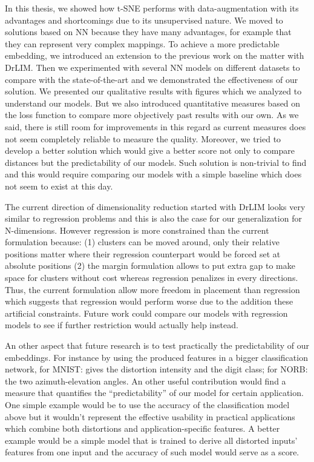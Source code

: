 \documentclass[a4paper,12pt]{report}
\begin{document}
In this thesis, we showed how t-SNE performs with data-augmentation with its advantages and shortcomings due to its unsupervised nature.
We moved to solutions based on NN because they have many advantages, for example that they can represent very complex mappings.
To achieve a more predictable embedding, we introduced an extension to the previous work on the matter with DrLIM.
Then we experimented with several NN models on different datasets to compare with the state-of-the-art and we demonstrated the effectiveness of our solution.
We presented our qualitative results with figures which we analyzed to understand our models.
But we also introduced quantitative measures based on the loss function to compare more objectively past results with our own.
As we said, there is still room for improvements in this regard as current measures does not seem completely reliable to measure the quality.
Moreover, we tried to develop a better solution which would give a better score not only to compare distances but the predictability of our models.
Such solution is non-trivial to find and this would require comparing our models with a simple baseline which does not seem to exist at this day.

The current direction of dimensionality reduction started with DrLIM looks very similar to regression problems and this is also the case for our generalization for N-dimensions.
However regression is more constrained than the current formulation because: (1) clusters can be moved around, only their relative positions matter where their regression counterpart would be forced set at absolute positions (2) the margin formulation allows to put extra gap to make space for clusters without cost whereas regression penalizes in every directions.
Thus, the current formulation allow more freedom in placement than regression which suggests that regression would perform worse due to the addition these artificial constraints.
Future work could compare our models with regression models to see if further restriction would actually help instead.

An other aspect that future research is to test practically the predictability of our embeddings.
For instance by using the produced features in a bigger classification network, for MNIST: gives the distortion intensity and the digit class; for NORB: the two azimuth-elevation angles.
An other useful contribution would find a measure that quantifies the ``predictability'' of our model for certain application.
One simple example would be to use the accuracy of the classification model above but it wouldn't represent the effective usability in practical applications which combine both distortions and application-specific features.
A better example would be a simple model that is trained to derive all distorted inputs' features from one input and the accuracy of such model would serve as a score.
\end{document}
